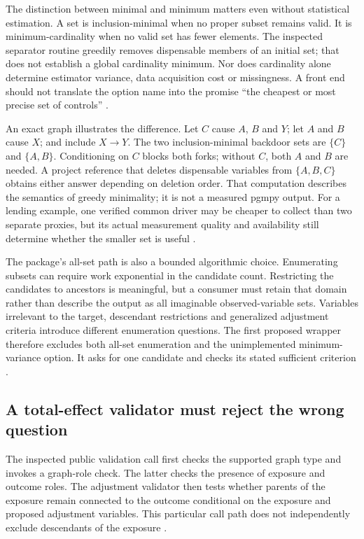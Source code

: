 The distinction between minimal and minimum matters even without statistical
estimation. A set is inclusion-minimal when no proper subset remains valid.
It is minimum-cardinality when no valid set has fewer elements. The inspected
separator routine greedily removes dispensable members of an initial set;
that does not establish a global cardinality minimum. Nor does cardinality
alone determine estimator variance, data acquisition cost or missingness.
A front end should not translate the option name into the promise
``the cheapest or most precise set of controls''
\citep{exec13_pgmpy_reuse_primary}.

An exact graph illustrates the difference. Let $C$ cause $A$, $B$ and $Y$;
let $A$ and $B$ cause $X$; and include $X\to Y$. The two inclusion-minimal
backdoor sets are $\{C\}$ and $\{A,B\}$. Conditioning on $C$ blocks both
forks; without $C$, both $A$ and $B$ are needed. A project reference that
deletes dispensable variables from $\{A,B,C\}$ obtains either answer
depending on deletion order. That computation describes the semantics of
greedy minimality; it is not a measured pgmpy output. For a lending example,
one verified common driver may be cheaper to collect than two separate
proxies, but its actual measurement quality and availability still determine
whether the smaller set is useful \citep{exec13_pgmpy_reuse_oracle}.

The package's all-set path is also a bounded algorithmic choice. Enumerating
subsets can require work exponential in the candidate count. Restricting
the candidates to ancestors is meaningful, but a consumer must retain that
domain rather than describe the output as all imaginable observed-variable
sets. Variables irrelevant to the target, descendant restrictions and
generalized adjustment criteria introduce different enumeration questions.
The first proposed wrapper therefore excludes both all-set enumeration and
the unimplemented minimum-variance option. It asks for one candidate and
checks its stated sufficient criterion
\citep{exec13_pgmpy_reuse_primary}.

\subsection{A total-effect validator must reject the wrong question}

The inspected public validation call first checks the supported graph type
and invokes a graph-role check. The latter checks the presence of exposure
and outcome roles. The adjustment validator then tests whether parents of
the exposure remain connected to the outcome conditional on the exposure
and proposed adjustment variables. This particular call path does not
independently exclude descendants of the exposure
\citep{exec13_pgmpy_reuse_primary}.

